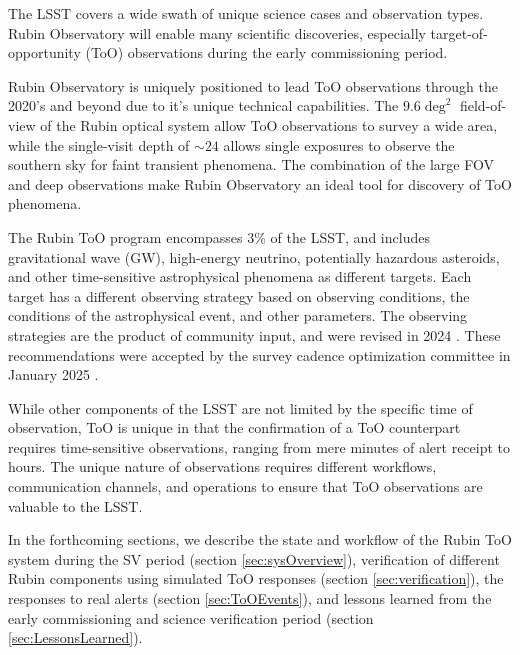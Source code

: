 The LSST covers a wide swath of unique science cases and observation types. Rubin Observatory will enable many scientific discoveries, especially target-of-opportunity (ToO) observations during the early commissioning period.

Rubin Observatory is uniquely positioned to lead ToO observations through the 2020's and beyond due to it's unique technical capabilities. The $9.6\deg^2$ field-of-view of the Rubin optical system allow ToO observations to survey a wide area, while the single-visit depth of $\sim24$ allows single exposures to observe the southern sky for faint transient phenomena. The combination of the large FOV and deep observations make Rubin Observatory an ideal tool for discovery of ToO phenomena.

The Rubin ToO program encompasses 3\% of the LSST, and includes gravitational wave (GW), high-energy neutrino, potentially hazardous asteroids, and other time-sensitive astrophysical phenomena as different targets. Each target has a different observing strategy based on observing conditions, the conditions of the astrophysical event, and other parameters. The observing strategies are the product of community input, and were revised in 2024 \citep{RubinToO2024}. These recommendations were accepted by the survey cadence optimization committee in January 2025 .

While other components of the LSST are not limited by the specific time of observation, ToO is unique in that the confirmation of a ToO counterpart requires time-sensitive observations, ranging from mere minutes of alert receipt to hours. The unique nature of observations requires different workflows, communication channels, and operations to ensure that ToO observations are valuable to the LSST.

In the forthcoming sections, we describe the state and workflow of the Rubin ToO system during the SV period (section \ref{sec:sysOverview}), verification of different Rubin components using simulated ToO responses (section \ref{sec:verification}), the responses to real alerts (section \ref{sec:ToOEvents}), and lessons learned from the early commissioning and science verification period (section \ref{sec:LessonsLearned}).
